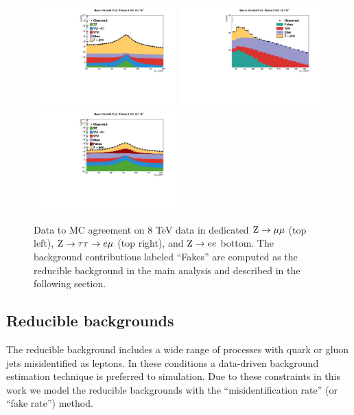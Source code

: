 \begin{figure}
\centering
\includegraphics[width=0.49\textwidth]{4_Analisys/pics/8TeV/plots/zmm/mass_rebin_log.pdf}
\includegraphics[width=0.49\textwidth]{4_Analisys/pics/8TeV/plots/em/mass_rebin_log-fakes.pdf}\\
\includegraphics[width=0.49\textwidth]{4_Analisys/pics/8TeV/plots/zee/mass_wfakes_log.pdf}
\caption{Data to MC agreement on 8 TeV data in dedicated $\mathrm{Z}\rightarrow\mu\mu$ (top left), $\mathrm{Z}\rightarrow \tau\tau \rightarrow e\mu$ (top right), and $\mathrm{Z}\rightarrow ee$ bottom. The background contributions labeled ``Fakes'' are computed as the reducible background in the main analysis and described in the following section. }
\label{fig:(dis)agreement}
\end{figure}

\subsection{Reducible backgrounds}

The reducible background includes a wide range of processes with quark or gluon jets misidentified as leptons. In these conditions a data-driven background estimation technique is preferred to simulation. Due to these constraints in this work we model the reducible backgrounds with the ``misidentification rate'' (or ``fake rate'') method.

